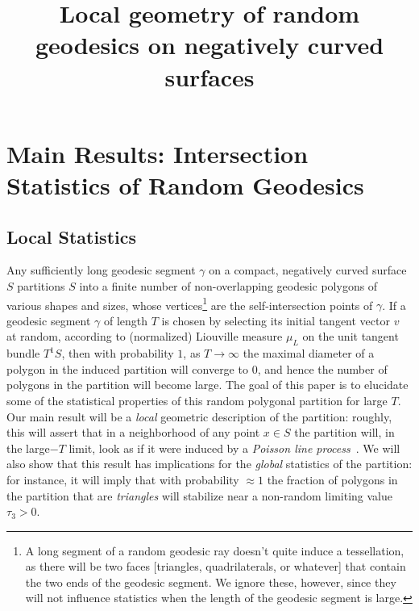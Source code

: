 \documentclass[AHL, Unicode, longabstracts, published]{cedram}
\title[Local geometry of random geodesics]{Local geometry of random geodesics on negatively curved surfaces}
\author{\firstname{Jayadev} \lastname{Athreya}}
\author{\firstname{Steve} \lastname{Lalley}}
\author{\firstname{Jenya} \lastname{Sapir}}
\author{\firstname{Matthew} \lastname{Wroten}}
\begin{document}
\maketitle

\section{Main Results: Intersection Statistics of Random Geodesics}\label{sec:local}

\subsection{Local Statistics}\label{ssec:local}
Any sufficiently long geodesic segment $\gamma$ on a compact, negatively curved surface $S$ partitions $S$ into a finite number of non-overlapping geodesic polygons of various shapes and sizes, whose vertices\footnote{A long segment of a random geodesic ray doesn't quite induce a tessellation, as there will be two faces [triangles, quadrilaterals, or whatever] that contain the two ends of the geodesic segment. We ignore these, however, since they will not influence statistics when the length of the geodesic segment is large.} are the self-intersection points of $\gamma$. If a geodesic segment $\gamma$ of length $T$ is chosen by selecting its initial tangent vector $v$ at random, according to (normalized) Liouville measure $\mu_{L}$ on the unit tangent bundle $T^1S$, then with probability $1$, as $T \rightarrow \infty$ the maximal diameter of a polygon in the induced partition will converge to $0$, and hence the number of polygons in the partition will become large. The goal of this paper is to elucidate some of the statistical properties of this random polygonal partition for large $T$. Our main result will be a \emph{local} geometric description of the partition: roughly, this will assert that in a neighborhood of any point $x\in S$ the partition will, in the large$-T$ limit, look as if it were induced by a
\emph{Poisson line process}~\cite{miles:pnas1,miles:pnas2}. We will also show that this result has implications for the \emph{global} statistics of the partition: for instance, it will imply that with probability $\approx 1$ the fraction of polygons in the partition that are \emph{triangles} will stabilize near a non-random limiting value $\tau_{3}>0$.
\end{document}
